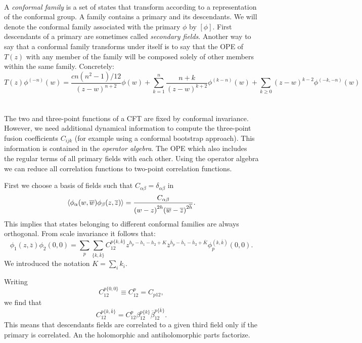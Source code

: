 \documentclass[submission, PhysLectNotes]{SciPost}
\begin{document}
 \\
A \emph{conformal family} is a set of states that transform according to a representation of the conformal group. A family contains a primary and its descendants. We will denote the conformal family associated with the primary $\phi$ by $[\phi]$. First descendants of a primary are sometimes called \emph{secondary fields}. Another way to say that a conformal family transforms under itself is to say that the OPE of $T(z)$ with any member of the family will be composed solely of other members within the same family. Concretely:
\begin{equation}
	T(z)\phi^{(-n)}(w) = \frac{cn(n^2-1)/12}{{(z-w)}^{n+2}}\phi(w) + \sum_{k=1}^{n}\frac{n+k}{{(z-w)}^{k+2}}\phi^{(k-n)}(w) + \sum_{k\geq 0}{(z-w)}^{k-2}\phi^{(-k,-n)}(w)
\end{equation}\\

 \\
The two and three-point functions of a CFT are fixed by conformal invariance. However, we need additional dynamical information to compute the three-point fusion coefficients $C_{ijk}$ (for example using a conformal bootstrap approach). This information is contained in the \emph{operator algebra}. The OPE which also includes the regular terms of all primary fields with each other. Using the operator algebra we can reduce all correlation functions to two-point correlation functions.

First we choose a basis of fields such that $C_{\alpha\beta} = \delta_{\alpha\beta}$ in
\begin{equation}
	\expval{\phi_\alpha(w,\overline{w})\phi_\beta(z,\overline{z})} = \frac{C_{\alpha\beta}}{{(w-z)}^{2h}{(\overline{w}-\overline{z})}^{2\overline{h}}}.
\end{equation}
This implies that states belonging to different conformal families are always orthogonal.
From scale invariance it follows that:
\begin{equation}
	\phi_1(z,\overline{z})\phi_2(0,0) = \sum_p \sum_{\{k,\overline{k}\}} C_{12}^{p\{k,\overline{k}\}}z^{h_p-h_1 -h_2+K} \overline{z}^{\overline{h}_p-\overline{h}_1-\overline{h}_2+\overline{K}}\phi_p^{(k,\overline{k})}(0,0).
\end{equation}
We introduced the notation $K = \sum_i k_i$.

Writing
\begin{equation}
	C_{12}^{p\{0,0\}} \equiv C^p_{12} = C_{p12},
\end{equation}
we find that
\begin{equation}
	C_{12}^{p\{k,\overline{k}\}} = C_{12}^p \beta_{12}^{p\{k\}} \overline{\beta}_{12}^{p\{\overline{k}\}}.
\end{equation}
This means that descendants fields are correlated to a given third field only if the primary is correlated. An the holomorphic and antiholomorphic parts factorize.
\end{document}
